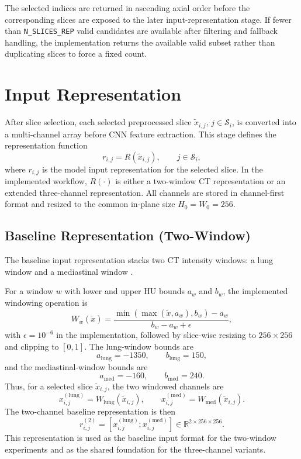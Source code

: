 The selected indices are returned in ascending axial order before the corresponding slices are exposed to the later input-representation stage. If fewer than \texttt{N\_SLICES\_REP} valid candidates are available after filtering and fallback handling, the implementation returns the available valid subset rather than duplicating slices to force a fixed count.



\section{Input Representation}
\label{sec:input_representation}

After slice selection, each selected preprocessed slice \(\tilde{x}_{i,j}\), \(j \in \mathcal{S}_i\), is converted into a multi-channel array before CNN feature extraction. This stage defines the representation function
\[
r_{i,j}
=
R(\tilde{x}_{i,j}),
\qquad
j \in \mathcal{S}_i,
\]
where \(r_{i,j}\) is the model input representation for the selected slice. In the implemented workflow, \(R(\cdot)\) is either a two-window CT representation or an extended three-channel representation. All channels are stored in channel-first format and resized to the common in-plane size \(H_0=W_0=256\).


\subsection{Baseline Representation (Two-Window)}
\label{sec:baseline_representation_two_window}

The baseline input representation stacks two CT intensity windows: a lung window and a mediastinal window \cite{whiting2015ctbasic,lu2020multiwindow}.

For a window \(w\) with lower and upper HU bounds \(a_w\) and \(b_w\), the implemented windowing operation is
\[
W_w(\tilde{x})
=
\frac{
\min\!\left(\max\!\left(\tilde{x}, a_w\right), b_w\right)-a_w
}{
b_w-a_w+\epsilon
},
\]
with \(\epsilon=10^{-6}\) in the implementation, followed by slice-wise resizing to \(256 \times 256\) and clipping to \([0,1]\). The lung-window bounds are
\[
a_{\mathrm{lung}}=-1350,
\qquad
b_{\mathrm{lung}}=150,
\]
and the mediastinal-window bounds are
\[
a_{\mathrm{med}}=-160,
\qquad
b_{\mathrm{med}}=240.
\]
Thus, for a selected slice \(\tilde{x}_{i,j}\), the two windowed channels are
\[
x_{i,j}^{(\mathrm{lung})}
=
W_{\mathrm{lung}}(\tilde{x}_{i,j}),
\qquad
x_{i,j}^{(\mathrm{med})}
=
W_{\mathrm{med}}(\tilde{x}_{i,j}).
\]
The two-channel baseline representation is then
\[
r_{i,j}^{(2)}
=
\left[
x_{i,j}^{(\mathrm{lung})};
x_{i,j}^{(\mathrm{med})}
\right]
\in
\mathbb{R}^{2 \times 256 \times 256}.
\]
This representation is used as the baseline input format for the two-window experiments and as the shared foundation for the three-channel variants.


